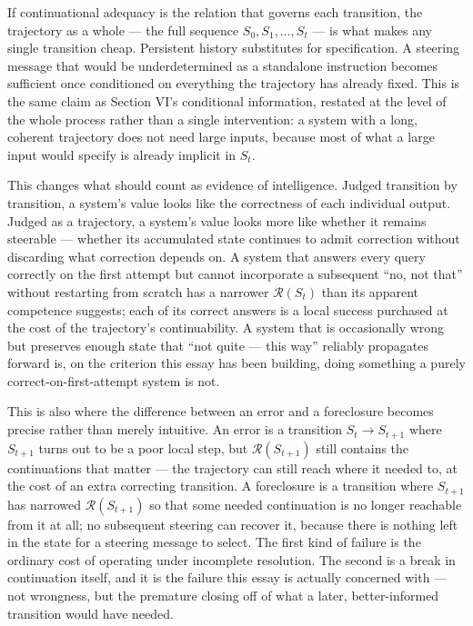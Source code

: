 \documentclass[11pt]{article}
\begin{document}
If continuational adequacy is the relation that governs each transition, the trajectory as a whole --- the full sequence $S_0, S_1, \ldots, S_t$ --- is what makes any single transition cheap. Persistent history substitutes for specification. A steering message that would be underdetermined as a standalone instruction becomes sufficient once conditioned on everything the trajectory has already fixed. This is the same claim as Section VI's conditional information, restated at the level of the whole process rather than a single intervention: a system with a long, coherent trajectory does not need large inputs, because most of what a large input would specify is already implicit in $S_t$.

This changes what should count as evidence of intelligence. Judged transition by transition, a system's value looks like the correctness of each individual output. Judged as a trajectory, a system's value looks more like whether it remains steerable --- whether its accumulated state continues to admit correction without discarding what correction depends on. A system that answers every query correctly on the first attempt but cannot incorporate a subsequent ``no, not that'' without restarting from scratch has a narrower $\mathcal{R}(S_t)$ than its apparent competence suggests; each of its correct answers is a local success purchased at the cost of the trajectory's continuability. A system that is occasionally wrong but preserves enough state that ``not quite --- this way'' reliably propagates forward is, on the criterion this essay has been building, doing something a purely correct-on-first-attempt system is not.

This is also where the difference between an error and a foreclosure becomes precise rather than merely intuitive. An error is a transition $S_t \to S_{t+1}$ where $S_{t+1}$ turns out to be a poor local step, but $\mathcal{R}(S_{t+1})$ still contains the continuations that matter --- the trajectory can still reach where it needed to, at the cost of an extra correcting transition. A foreclosure is a transition where $S_{t+1}$ has narrowed $\mathcal{R}(S_{t+1})$ so that some needed continuation is no longer reachable from it at all; no subsequent steering can recover it, because there is nothing left in the state for a steering message to select. The first kind of failure is the ordinary cost of operating under incomplete resolution. The second is a break in continuation itself, and it is the failure this essay is actually concerned with --- not wrongness, but the premature closing off of what a later, better-informed transition would have needed.
\end{document}
